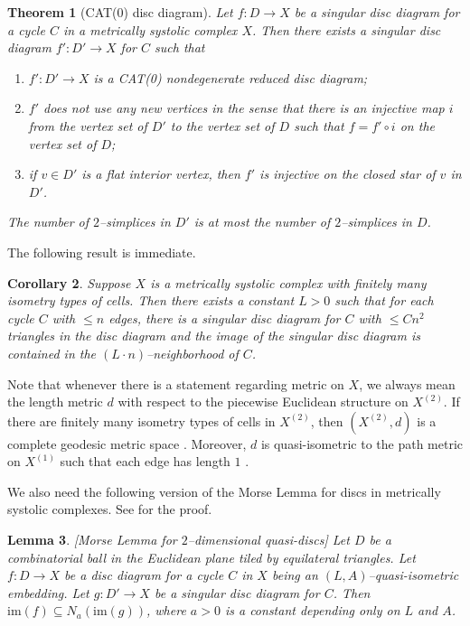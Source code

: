 \documentclass[11pt]{amsart}
\newtheorem{theorem}{Theorem}[section]
\newtheorem{lemma}[theorem]{Lemma}
\newtheorem{corollary}[theorem]{Corollary}
\theoremstyle{definition}
\newcommand {\mr}{\mathrm}
\newcommand{\sk}[2]{#1^{(#2)}}
\newcommand{\HOdiscII}{Theorem 2.8}
\newcommand{\morse}{Theorem 3.9}
\begin{document}
\begin{theorem}[CAT(0) disc diagram]
	\cite[\HOdiscII]{Artinmetric}
	\label{thm:CAT(0)diagrem}
	Let $f\colon D\to X$ be a singular disc diagram for a cycle $C$ in a metrically systolic
	complex $X$. Then there exists a singular disc diagram $f' \colon D' \to X$ for $C$ such that 
	\begin{enumerate}
		\item $f' \colon D' \to X$ is a CAT(0) nondegenerate reduced disc diagram;
		\item $f'$ does not use any new vertices in the sense that there is an injective map $i$ from the vertex set of $D'$ to the vertex set of $D$ such that $f=f'\circ i$ on the vertex set of $D$;
		\item if $v\in D'$ is a flat interior vertex, then $f'$ is injective on the closed star of $v$ in $D'$.
	\end{enumerate}	
The number of $2$--simplices in $D'$ is at most the number of $2$--simplices in $D$. 
\end{theorem}

The following result is immediate. 
\begin{corollary}
	\label{cor:quadratic}
	Suppose $X$ is a metrically systolic complex with finitely many isometry types of cells. Then there exists a constant $L>0$ such that for each cycle $C$ with $\le n$ edges, there is a singular disc diagram for $C$ with $\le Cn^2$ triangles in the disc diagram and the image of the singular disc diagram is contained in the $(L\cdot n)$--neighborhood of $C$.
\end{corollary}

Note that whenever there is a statement regarding metric on $X$, we always mean the length metric $d$ with respect to the piecewise Euclidean structure on $\sk{X}{2}$. If there are finitely many isometry types of cells in $\sk{X}{2}$, then $(\sk{X}{2},d)$ is a complete geodesic metric space \cite[Theorem I.7.19]{BridsonHaefliger1999}. Moreover, $d$ is quasi-isometric to the path metric on $\sk{X}{1}$ such that each edge has length $1$ \cite[Proposition I.7.31]{BridsonHaefliger1999}.

We also need the following version of the Morse Lemma for discs in metrically systolic complexes. See \cite[\morse]{Artinmetric} for the proof.
\begin{lemma}
	\label{thm:Morse lemma}[Morse Lemma for $2$--dimensional quasi-discs]
	Let $D$ be a combinatorial ball in the Euclidean plane tiled by equilateral triangles. Let
	$f\colon D \to X$ be a disc diagram for a cycle $C$ in $X$ 
	being an $(L,A)$--quasi-isometric embedding. 
	Let $g\colon D' \to X$ be a singular disc diagram for $C$.
	Then $\mr{im}(f)\subseteq N_a(\mr{im}(g))$, where $a>0$ is a constant depending only on $L$ and $A$.
\end{lemma}
\end{document}
